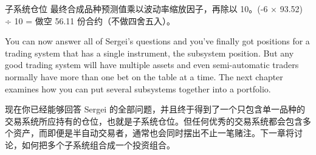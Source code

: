 \begin{chineseblock}子系统仓位 最终合成品种预测值乘以波动率缩放因子，再除以 10。(-6 × 93.52) ÷ 10 = 做空 56.11 份合约（不做四舍五入）。\end{chineseblock}

\bipairgap

\begin{englishblock} You can now answer all of Sergei's questions and you've finally got positions for a trading system that has a single instrument, the subsystem position. But any good trading system will have multiple assets and even semi-automatic traders normally have more than one bet on the table at a time. The next chapter examines how you can put several subsystems together into a portfolio. \end{englishblock}

\begin{chineseblock}现在你已经能够回答 Sergei 的全部问题，并且终于得到了一个只包含单一品种的交易系统所应持有的仓位，也就是子系统仓位。但任何优秀的交易系统都会包含多个资产，而即便是半自动交易者，通常也会同时摆出不止一笔赌注。下一章将讨论，如何把多个子系统组合成一个投资组合。\end{chineseblock}
